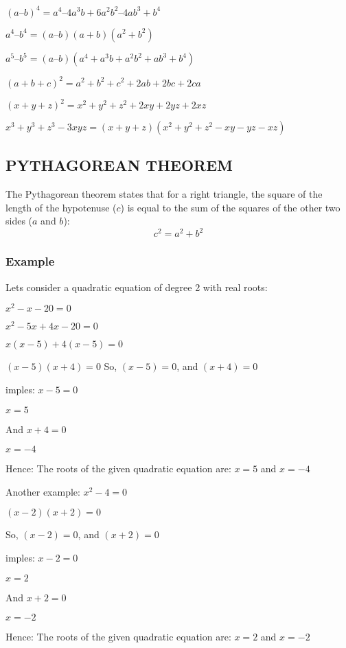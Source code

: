 \documentclass{article}
\begin{document}
$(a – b)^4 = a^4 – 4a^3b + 6a^2b^2 – 4ab^3 + b^4$

$a^4 – b^4 = (a – b)(a + b)(a^2 + b^2)$

$a^5 – b^5 = (a – b)(a^4 + a^3b + a^2b^2 + ab^3 + b^4)$

$(a +b+ c)^2=a^2+b^2+c^2+2ab+2bc+2ca$

$(x+ y+ z)^2=x^2+y^2+z^2+2xy+2yz+2xz$

$x^3 + y^3 + z^3 - 3xyz = (x + y + z)(x^2 + y^2 + z^2 - xy - yz - xz)$

\subsection{PYTHAGOREAN THEOREM}
The Pythagorean theorem states that for a right triangle, the square of the length of the hypotenuse ($c$) is equal to the sum of the squares of the other two sides ($a$ and $b$):
\[
c^2 = a^2 + b^2
\]

\subsubsection{Example}
Lets consider a quadratic equation of degree 2 with real roots:

$x^2-x-20=0$

$x^2-5x+4x-20=0$

$x(x-5)+4(x-5)=0$

$(x-5)(x+4)=0$
So, 
$(x-5) =0$, and $(x+4) =0$

imples:
$x-5 = 0$

$x = 5$

And $ x+4 = 0$

$x =-4$

Hence:
The roots of the given quadratic equation are:
$x=5$ and $ x=-4$

Another example:
$x^2-4=0$

$(x-2)(x+2)=0$

So, 
$(x-2) =0$, and $(x+2) =0$

imples:
$x-2 = 0$

$x = 2$

And $ x+2 = 0$

$x =-2$

Hence:
The roots of the given quadratic equation are:
$x=2$ and $ x=-2$
\end{document}
